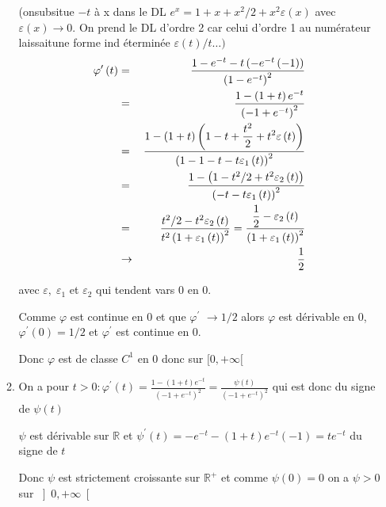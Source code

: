 \documentclass[a4paper, 11pt,reqno]{article}
\begin{document}
\begin{enumerate}
\begin{enumerate}
(onsubsitue $-t$ \`{a} x dans le DL $e^{x}=1+x+x^{2}/2+x^{2}\varepsilon
\left( x\right) $ avec $\varepsilon \left( x\right) \rightarrow 0.$ On prend
le DL d'ordre 2 car celui d'ordre 1 au num\'{e}rateur laissaitune forme ind%
\'{e}termin\'{e}e $\varepsilon \left( t\right) /t\dots )$%
\begin{eqnarray*}
\varphi ^{\prime }\left( t\right) &=&\frac{1-e^{-t}-t\left( -e^{-t}\left(
-1\right) \right) }{\left( 1-e^{-t}\right) ^{2}} \\
&=&\frac{1-\left( 1+t\right) e^{-t}}{\left( -1+e^{-t}\right) ^{2}} \\
&=&\frac{1-\left( 1+t\right) \left( 1-t+\displaystyle\frac{t^{2}}{2}%
+t^{2}\varepsilon \left( t\right) \right) }{\left( 1-1-t-t\varepsilon
_{1}\left( t\right) \right) ^{2}} \\
&=&\frac{1-\left( 1-t^{2}/2+t^{2}\varepsilon _{2}\left( t\right) \right) }{%
\left( -t-t\varepsilon _{1}\left( t\right) \right) ^{2}} \\
&=&\frac{t^{2}/2-t^{2}\varepsilon _{2}\left( t\right) }{t^{2}\left(
1+\varepsilon _{1}\left( t\right) \right) ^{2}}=\frac{\displaystyle\frac{1}{2%
}-\varepsilon _{2}\left( t\right) }{\left( 1+\varepsilon _{1}\left( t\right)
\right) ^{2}} \\
&\rightarrow &\frac{1}{2}
\end{eqnarray*}

avec $\varepsilon ,\;\varepsilon _{1}$ et $\varepsilon _{2}$ qui tendent
vars $0$ en $0.$

Comme $\varphi $ est continue en $0$ et que $\varphi ^{\prime }$ $%
\rightarrow 1/2$ alors $\varphi $ est d\'{e}rivable en $0$, $\varphi
^{\prime }\left( 0\right) =1/2$ et $\varphi ^{\prime }$ est continue en $0.$

Donc $\varphi $ est de classe $C^{1}$ en $0$ donc sur $[0,+\infty [$

\item On a pour $t>0:\displaystyle
\varphi ^{\prime }\left( t\right) =\frac{1-\left( 1+t\right) e^{-t}}{\left(
-1+e^{-t}\right) ^{2}}=\frac{\psi \left( t\right) }{\left( -1+e^{-t}\right)
^{2}}$ qui est donc du signe de $\psi \left( t\right) $

$\psi $ est d\'{e}rivable sur $\mathbb{R}$ et $\psi ^{\prime }\left(
t\right) =-e^{-t}-\left( 1+t\right) e^{-t}\left( -1\right) =te^{-t}$ du
signe de $t$

Donc $\psi $ est strictement croissante sur $\mathbb{R}^{+}$ et comme $\psi
\left( 0\right) =0$ on a $\psi >0$ sur $\left] 0,+\infty \right[ $


\end{enumerate}
\end{enumerate}
\end{document}
